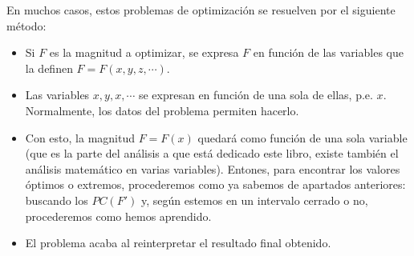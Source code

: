 	En muchos casos, estos problemas de optimización se resuelven por el siguiente método:
	
	\begin{itemize}
		\item Si $F$ es la magnitud a optimizar, se expresa $F$ en función de las variables que la definen $F=F(x,y,z,\cdots)$.
		\item Las variables $x,y,x,\cdots$ se expresan en función de una sola de ellas, p.e. $x$. Normalmente, los datos del problema permiten hacerlo.
		\item Con esto, la magnitud $F=F(x)$ quedará como función de una sola variable (que es la parte del análisis a que está dedicado este libro, existe también el análisis matemático en varias variables). Entones, para encontrar los valores óptimos o extremos, procederemos como ya sabemos de apartados anteriores: buscando los $PC(F')$ y, según estemos en un intervalo cerrado o no, procederemos como hemos aprendido.
		\item El problema acaba al reinterpretar el resultado final obtenido.
	\end{itemize}
	

